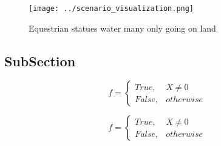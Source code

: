 \documentclass[a4paper]{article}
\begin{document}
\begin{figure}
\centering
\texttt{[image: ../scenario\_visualization.png]}
\caption{Equestrian statues water many only going on land 
}
\end{figure}
 
\subsection{SubSection}

\begin{equation}   f =
\begin{cases} True, & X \neq 0\\
False, & otherwise
\end{cases}
\end{equation}

\begin{equation}   f =
\begin{cases} True, & X \neq 0\\
False, & otherwise
\end{cases}
\end{equation}
\end{document}
